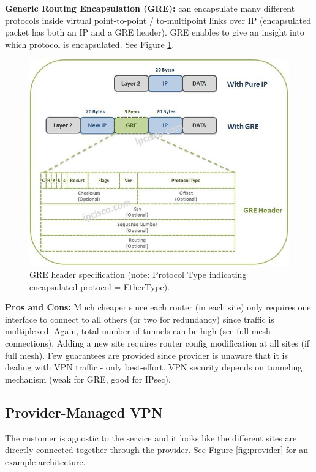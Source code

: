 \textbf{Generic Routing Encapsulation (GRE):} can encapsulate many different protocols inside virtual point-to-point / to-multipoint links over IP (encapsulated packet has both an IP and a GRE header). GRE enables to give an insight into which protocol is encapsulated. See Figure \ref{fig:gre}.

\begin{figure}[h]
	\centering
	\includegraphics[scale=0.5]{images/3-gre.jpg}
	\caption{GRE header specification (note: Protocol Type indicating encapsulated protocol = EtherType).}
	\label{fig:gre}
\end{figure}

\textbf{Pros and Cons:} Much cheaper since each router (in each site) only requires one interface to connect to all others (or two for redundancy) since traffic is multiplexed. Again, total number of tunnels can be high (see full mesh connections). Adding a new site requires router config modification at all sites (if full mesh). Few guarantees are provided since provider is unaware that it is dealing with VPN traffic - only best-effort. VPN security depends on tunneling mechanism (weak for GRE, good for IPsec).


\subsection{Provider-Managed VPN}

The customer is agnostic to the service and it looks like the different sites are directly connected together through the provider. See Figure \ref{fig:provider} for an example architecture.

